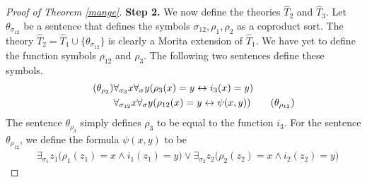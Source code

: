 \begin{proof}[Proof of Theorem \ref{mange}]
\textbf{Step 2.} We now define the theories $\widehat{T}_2$ and $\widehat{T}_3$. Let $\theta_{\sigma_{12}}$ be a sentence that defines the symbols $\sigma_{12}, \rho_1, \rho_2$ as a coproduct sort. The theory $\widehat{T}_2=\widehat{T}_1\cup\{\theta_{\sigma_{12}}\}$ is clearly a Morita extension of $\widehat{T}_1$. 
%
We have yet to define the function symbols $\rho_{12}$ and $\rho_3$. The following two sentences define these symbols.
\begin{align*}
\tag{$\theta_{\rho_3}$}
&\forall_{\sigma_3} x \forall_\sigma y(\rho_3(x)=y\leftrightarrow i_3(x)=y)\\
%
&\forall_{\sigma_{12}} x \forall_\sigma y( \rho_{12}(x)=y\leftrightarrow \psi(x, y))
\tag{$\theta_{\rho_{12}}$}
\end{align*}
The sentence $\theta_{\rho_3}$ simply defines $\rho_3$ to be equal to the function $i_3$. For the sentence $\theta_{\rho_{12}}$, we define the formula $\psi(x,y)$ to be
\begin{align*}
&\exists_{\sigma_{1}} z_1 \big( \rho_{1}(z_1)=x\land i_{1}(z_1)=y\big)
\lor\exists_{\sigma_{2}} z_2\big( \rho_{2}(z_2)=x\land i_{2}(z_2)=y\big)
\end{align*}

\end{proof}
